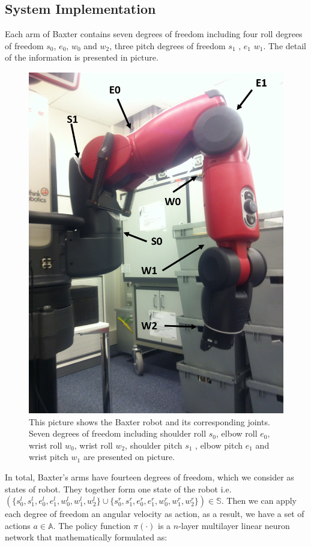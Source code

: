 \documentclass[officiallayout]{tktla}
\begin{document}
\subsection{System Implementation}
Each arm of Baxter contains seven degrees of freedom including four roll degrees of freedom $s_0$, $e_0$, $w_0$ and $w_2$, three pitch degrees of freedom $s_1$ , $e_1$ $w_1$. The detail of the information is presented in picture.
\begin{figure}[h]
\centering
\includegraphics[scale=0.7]{baxter_arm_annotated}
\caption{This picture shows the Baxter robot and its corresponding joints. Seven degrees of freedom including shoulder roll $s_0$,  elbow roll $e_0$, wrist roll $w_0$, wrist roll $w_2$, shoulder pitch $s_1$ , elbow pitch $e_1$ and wrist pitch $w_1$ are presented on picture.}
\end{figure}
In total, Baxter's arms have fourteen degrees of freedom, which we consider as states of robot. They together form one state of the robot i.e. $(\{s^l_0, s^l_1, e^l_0, e^l_1, w^l_0, w^l_1, w^l_2\}\cup\{s^r_0, s^r_1, e^r_0, e^r_1, w^r_0, w^r_1, w^r_2\}) \in \mathbb{S}$. Then we can apply each degree of freedom an angular velocity as action, as a result, we have a set of actions $a \in \mathbb{A}$. The policy function $\pi(\cdot)$ is a $n$-layer multilayer linear neuron network that mathematically formulated as:
\end{document}
